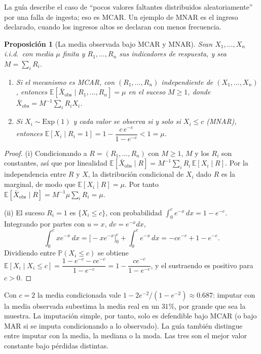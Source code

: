 \documentclass[11pt]{article}
\newtheorem{proposicion}[teorema]{Proposición}
\theoremstyle{definition}
\theoremstyle{remark}
\newcommand{\E}{\mathbb{E}}
\newcommand{\Prob}{\mathbb{P}}
\begin{document}
\noindent La guía describe el caso de ``pocos valores faltantes distribuidos aleatoriamente'' por una falla de ingesta; eso es MCAR. Un ejemplo de MNAR es el ingreso declarado, cuando los ingresos altos se declaran con menos frecuencia.

\begin{proposicion}[La media observada bajo MCAR y MNAR]\label{prop:mcar}
\noindent Sean $X_1,\dots,X_n$ i.i.d.\ con media $\mu$ finita y $R_1,\dots,R_n$ sus indicadores de respuesta, y sea $M=\sum_i R_i$.
\begin{enumerate}[label=(\roman*)]
\item Si el mecanismo es MCAR, con $(R_1,\dots,R_n)$ independiente de $(X_1,\dots,X_n)$, entonces $\E[\bar X_{\mathrm{obs}}\mid R_1,\dots,R_n]=\mu$ en el suceso $M\ge1$, donde $\bar X_{\mathrm{obs}}=M^{-1}\sum_i R_iX_i$.
\item Si $X_i\sim\mathrm{Exp}(1)$ y cada valor se observa si y solo si $X_i\le c$ (MNAR), entonces $\E[X_i\mid R_i=1]=1-\dfrac{c\,e^{-c}}{1-e^{-c}}<1=\mu$.
\end{enumerate}
\end{proposicion}
\begin{proof}
\noindent (i) Condicionando a $R=(R_1,\dots,R_n)$ con $M\ge1$, $M$ y los $R_i$ son constantes, así que por linealidad $\E[\bar X_{\mathrm{obs}}\mid R]=M^{-1}\sum_iR_i\,\E[X_i\mid R]$. Por la independencia entre $R$ y $X$, la distribución condicional de $X_i$ dado $R$ es la marginal, de modo que $\E[X_i\mid R]=\mu$. Por tanto $\E[\bar X_{\mathrm{obs}}\mid R]=M^{-1}\mu\sum_iR_i=\mu$.

\medskip

\noindent (ii) El suceso $R_i=1$ es $\{X_i\le c\}$, con probabilidad $\int_0^c e^{-x}\,dx=1-e^{-c}$. Integrando por partes con $u=x$, $dv=e^{-x}dx$,
\[
\int_0^c x e^{-x}\,dx=\big[-xe^{-x}\big]_0^c+\int_0^c e^{-x}\,dx=-ce^{-c}+1-e^{-c}.
\]
Dividiendo entre $\Prob(X_i\le c)$ se obtiene $\E[X_i\mid X_i\le c]=\dfrac{1-e^{-c}-ce^{-c}}{1-e^{-c}}=1-\dfrac{ce^{-c}}{1-e^{-c}}$, y el sustraendo es positivo para $c>0$.
\end{proof}

\noindent Con $c=2$ la media condicionada vale $1-2e^{-2}/(1-e^{-2})\approx 0.687$: imputar con la media observada subestima la media real en un $31\%$, por grande que sea la muestra. La imputación simple, por tanto, solo es defendible bajo MCAR (o bajo MAR si se imputa condicionando a lo observado). La guía también distingue entre imputar con la media, la mediana o la moda. Las tres son el mejor valor constante bajo pérdidas distintas.
\end{document}
